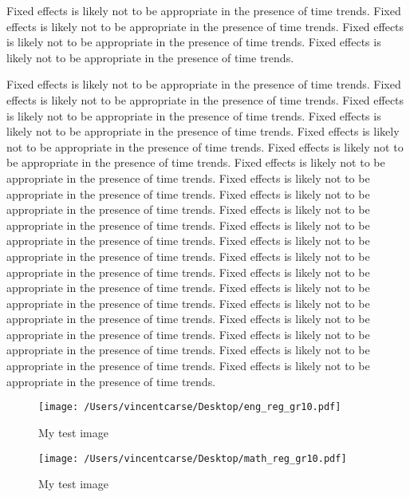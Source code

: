 \documentclass[11pt]{article}
\begin{document}
Fixed effects is likely not to be appropriate in the presence of time trends. 
Fixed effects is likely not to be appropriate in the presence of time trends. 
Fixed effects is likely not to be appropriate in the presence of time trends. 
Fixed effects is likely not to be appropriate in the presence of time trends. 

Fixed effects is likely not to be appropriate in the presence of time trends. 
Fixed effects is likely not to be appropriate in the presence of time trends. 
Fixed effects is likely not to be appropriate in the presence of time trends. 
Fixed effects is likely not to be appropriate in the presence of time trends. 
Fixed effects is likely not to be appropriate in the presence of time trends. 
Fixed effects is likely not to be appropriate in the presence of time trends. 
Fixed effects is likely not to be appropriate in the presence of time trends. 
Fixed effects is likely not to be appropriate in the presence of time trends. 
Fixed effects is likely not to be appropriate in the presence of time trends. 
Fixed effects is likely not to be appropriate in the presence of time trends. 
Fixed effects is likely not to be appropriate in the presence of time trends. 
Fixed effects is likely not to be appropriate in the presence of time trends. 
Fixed effects is likely not to be appropriate in the presence of time trends. 
Fixed effects is likely not to be appropriate in the presence of time trends. 
Fixed effects is likely not to be appropriate in the presence of time trends. 
Fixed effects is likely not to be appropriate in the presence of time trends. 
Fixed effects is likely not to be appropriate in the presence of time trends. 
Fixed effects is likely not to be appropriate in the presence of time trends. 
Fixed effects is likely not to be appropriate in the presence of time trends. 
Fixed effects is likely not to be appropriate in the presence of time trends. 


\begin{figure}
    \label{image-myimage}
    \texttt{[image: /Users/vincentcarse/Desktop/eng\_reg\_gr10.pdf]}
    \caption{My test image}
\end{figure}



\begin{figure}
    \label{image-myimage}
    \texttt{[image: /Users/vincentcarse/Desktop/math\_reg\_gr10.pdf]}
    \caption{My test image}
\end{figure}
\end{document}
